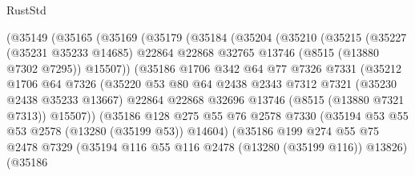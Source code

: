 \begin{lexlean}{RustStd}
\begin{coremodule}
                  (@35149
                    (@35165
                      (@35169
                        (@35179
                          (@35184
                            (@35204
                              (@35210
                                (@35215
                                  (@35227
                                    (@35231 @35233 @14685)
                                    @22864
                                    @22868
                                    @32765
                                    @13746
                                    (@8515 (@13880 @7302 @7295))
                                    @15507))
                                (@35186
                                  @1706
                                  @342
                                  @64
                                  @77
                                  @7326
                                  @7331
                                  (@35212
                                    @1706
                                    @64
                                    @7326
                                    (@35220
                                      @53
                                      @80
                                      @64
                                      @2438
                                      @2343
                                      @7312
                                      @7321
                                      (@35230 @2438 @35233 @13667)
                                      @22864
                                      @22868
                                      @32696
                                      @13746
                                      (@8515 (@13880 @7321 @7313))
                                      @15507))
                                  (@35186
                                    @128
                                    @275
                                    @55
                                    @76
                                    @2578
                                    @7330
                                    (@35194 @53 @55 @53 @2578 (@13280 (@35199 @53)) @14604)
                                    (@35186
                                      @199
                                      @274
                                      @55
                                      @75
                                      @2478
                                      @7329
                                      (@35194 @116 @55 @116 @2478 (@13280 (@35199 @116)) @13826)
                                      (@35186

\end{coremodule}
\end{lexlean}
